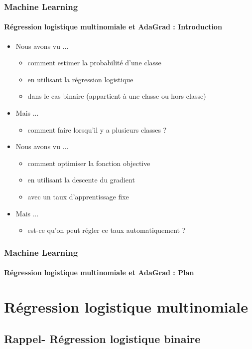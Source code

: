 \documentclass[xcolor=table]{beamer}
\subtitle[Multinomial regression and AdaGrad]{Multinomial regression and AdaGrad}
\begin{document}
	
\begin{frame}
	\frametitle{Machine Learning}
	\framesubtitle{Régression logistique multinomiale et AdaGrad : Introduction}
	
	\begin{itemize}
		\item Nous avons vu ...
		\begin{itemize}
			\item comment estimer la probabilité d'une classe
			\item en utilisant la régression logistique
			\item dans le cas binaire (appartient à une classe ou hors classe)
		\end{itemize}
		\item Mais ...
		\begin{itemize}
			\item comment faire lorsqu'il y a plusieurs classes ?
		\end{itemize}
		\item Nous avons vu ...
		\begin{itemize}
			\item comment optimiser la fonction objective
			\item en utilisant la descente du gradient
			\item avec un taux d'apprentissage fixe
		\end{itemize}
		\item Mais ...
		\begin{itemize}
			\item est-ce qu'on peut régler ce taux automatiquement ?
		\end{itemize}
	\end{itemize}
\end{frame}


\begin{frame}
	\frametitle{Machine Learning}
	\framesubtitle{Régression logistique multinomiale et AdaGrad : Plan}
	
	\begin{multicols}{2}
		\tableofcontents
	\end{multicols}
\end{frame}

\section{Régression logistique multinomiale}

\subsection{Rappel- Régression logistique binaire}
\end{document}
